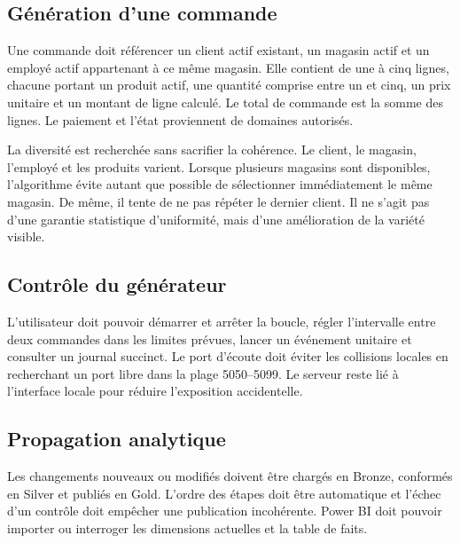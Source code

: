 \subsection{Génération d'une commande}
Une commande doit référencer un client actif existant, un magasin actif et un employé actif appartenant à ce même magasin. Elle contient de une à cinq lignes, chacune portant un produit actif, une quantité comprise entre un et cinq, un prix unitaire et un montant de ligne calculé. Le total de commande est la somme des lignes. Le paiement et l'état proviennent de domaines autorisés.

La diversité est recherchée sans sacrifier la cohérence. Le client, le magasin, l'employé et les produits varient. Lorsque plusieurs magasins sont disponibles, l'algorithme évite autant que possible de sélectionner immédiatement le même magasin. De même, il tente de ne pas répéter le dernier client. Il ne s'agit pas d'une garantie statistique d'uniformité, mais d'une amélioration de la variété visible.

\subsection{Contrôle du générateur}
L'utilisateur doit pouvoir démarrer et arrêter la boucle, régler l'intervalle entre deux commandes dans les limites prévues, lancer un événement unitaire et consulter un journal succinct. Le port d'écoute doit éviter les collisions locales en recherchant un port libre dans la plage 5050--5099. Le serveur reste lié à l'interface locale pour réduire l'exposition accidentelle.

\subsection{Propagation analytique}
Les changements nouveaux ou modifiés doivent être chargés en Bronze, conformés en Silver et publiés en Gold. L'ordre des étapes doit être automatique et l'échec d'un contrôle doit empêcher une publication incohérente. Power BI doit pouvoir importer ou interroger les dimensions actuelles et la table de faits.

